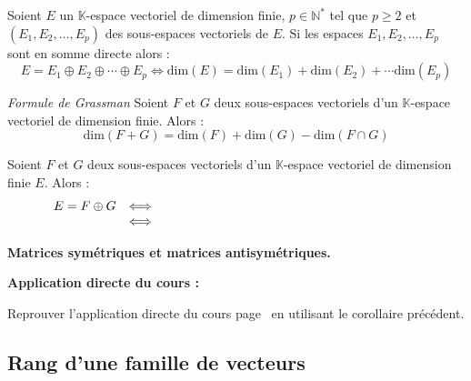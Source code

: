 \documentclass[french,11pt,twoside]{VcCours}
\newenvironment{ApplicationDirecte}{\textbf{Application directe du cours :}

}{}
\begin{document}
\begin{Corollaire}{} Soient $E$ un $\mathbb{K}$-espace vectoriel de dimension finie, $p \in \mathbb{N}^*$ tel que $p \geq 2$ et $(E_1, E_2, \ldots, E_p)$ des sous-espaces vectoriels de $E$. Si les espaces $E_1, E_2, \ldots, E_p$ sont en somme directe alors :
$$ E = E_1 \oplus E_2 \oplus \cdots \oplus E_p \Longleftrightarrow  \textrm{dim}(E) = \textrm{dim}(E_1) + \textrm{dim}(E_2) + \cdots \textrm{dim}(E_p)$$
\end{Corollaire}


\begin{Proposition}{\emph{Formule de Grassman}} Soient $F$ et $G$ deux sous-espaces vectoriels d'un $\mathbb{K}$-espace vectoriel de dimension finie. Alors :
$$ \textrm{dim}(F+G) = \textrm{dim}(F) + \textrm{dim}(G) - \textrm{dim}( F \cap G)$$
\end{Proposition}

\begin{Corollaire}{} Soient $F$ et $G$ deux sous-espaces vectoriels d'un $\mathbb{K}$-espace vectoriel de dimension finie $E$. Alors :
$$ \begin{array}{ccl}
E = F \oplus G & \Longleftrightarrow & \phantom{ F \cap G = \lbrace 0_E \rbrace \hbox{ et } \textrm{dim}(E) = \textrm{dim}(F) + \textrm{dim}(G)} \\
& \Longleftrightarrow & \phantom{ F + G = E  \hbox{ et } \textrm{dim}(E) = \textrm{dim}(F) + \textrm{dim}(G)} \\
\end{array}$$
\end{Corollaire}

\begin{Exemple} \textbf{Matrices symétriques et matrices antisymétriques.}
\end{Exemple}


\newpage
\vspace*{14cm}
\begin{ApplicationDirecte} Reprouver l'application directe du cours 
	page~\pageref{Exo} en utilisant le corollaire précédent.
\end{ApplicationDirecte}

\subsection{Rang d'une famille de vecteurs}
\end{document}
